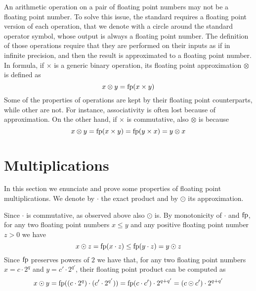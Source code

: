 An arithmetic operation on a pair of floating point numbers may not be a floating point number. To solve this issue, the standard requires a floating point version of each operation, that we denote with a circle around the standard operator symbol, whose output is always a floating point number. The definition of those operations require that they are performed on their inputs as if in infinite precision, and then the result is approximated to a floating point number. In formula, if $\times$ is a generic binary operation, its floating point approximation $\otimes$ is defined as
\[
x \otimes y = \text{fp}(x \times y)
\]
Some of the properties of operations are kept by their floating point counterparts, while other are not. For instance, associativity is often lost because of approximation. On the other hand, if $\times$ is commutative, also $\otimes$ is because
\[
x \otimes y = \text{fp}(x \times y) = \text{fp} (y \times x) = y \otimes x
\]

\section{Multiplications}
In this section we enunciate and prove some properties of floating point multiplications. We denote by $\cdot$ the exact product and by $\odot$ its approximation.

Since $\cdot$ is commutative, as observed above also $\odot$ is.
By monotonicity of $\cdot$ and $\text{fp}$, for any two floating point numbers $x \le y$ and any positive floating point number $z > 0$ we have
\[
x \odot z = \text{fp}(x \cdot z) \le \text{fp}(y \cdot z) = y \odot z
\]
Since $\text{fp}$ preserves powers of $2$ we have that, for any two floating point numbers $x = c \cdot 2^q$ and $y = c' \cdot 2^{q'}$, their floating point product can be computed as
\[
x \odot y = \text{fp}((c \cdot 2^q) \cdot (c' \cdot 2^{q'})) = \text{fp}(c \cdot c') \cdot 2^{q + q'} = (c \odot c') \cdot 2^{q + q'}
\]

